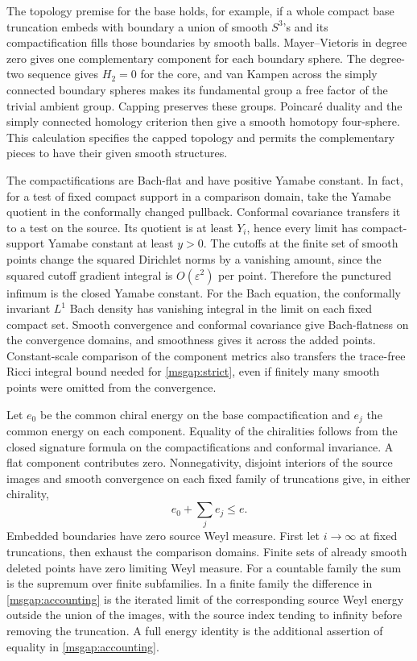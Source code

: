 \documentclass[11pt]{article}
\numberwithin{equation}{section}
\theoremstyle{definition}
\theoremstyle{remark}
\begin{document}
The topology premise for the base holds, for example, if a whole
compact base truncation embeds with boundary a union of smooth
\(S^3\)'s and its compactification fills those boundaries by
smooth balls. Mayer--Vietoris in degree zero gives one
complementary component for each boundary sphere. The degree-two
sequence gives \(H_2=0\) for the core, and van Kampen across the
simply connected boundary spheres makes its fundamental group a
free factor of the trivial ambient group. Capping preserves these
groups. Poincar\'e duality and the simply connected homology
criterion then give a smooth homotopy four-sphere. This calculation
specifies the capped topology and permits the complementary pieces
to have their given smooth structures.

The compactifications are Bach-flat and have positive Yamabe
constant. In fact, for a test of fixed compact support in a
comparison domain, take the Yamabe quotient in the conformally
changed pullback. Conformal covariance transfers it to a test on
the source. Its quotient is at least \(Y_i\), hence every limit
has compact-support Yamabe constant at least \(y>0\).
The cutoffs at the finite set of smooth points change the squared
Dirichlet norms by a vanishing amount, since the squared cutoff
gradient integral is \(O(\varepsilon^2)\) per point. Therefore the
punctured infimum is the closed Yamabe constant. For the Bach
equation, the conformally invariant \(L^1\) Bach density has
vanishing integral in the limit on each fixed compact set.
Smooth convergence and conformal covariance give Bach-flatness
on the convergence domains, and smoothness gives it across the
added points. Constant-scale comparison of the component metrics
also transfers the trace-free Ricci integral bound needed for
\eqref{msgap:strict}, even if finitely many smooth points were
omitted from the convergence.

Let \(e_0\) be the common chiral energy on the base compactification
and \(e_j\) the common energy on each component. Equality of the
chiralities follows from the closed signature formula on the
compactifications and conformal invariance. A flat component
contributes zero. Nonnegativity, disjoint interiors of the source
images and smooth convergence on each fixed family of truncations
give, in either chirality,
\begin{equation}\label{msgap:accounting}
 e_0+\sum_j e_j\le e .
\end{equation}
Embedded boundaries have zero source Weyl measure. First let
\(i\to\infty\) at fixed truncations, then exhaust the comparison
domains. Finite sets of already smooth deleted points have zero
limiting Weyl measure. For a countable family the sum is the
supremum over finite subfamilies. In a finite family the difference
in \eqref{msgap:accounting} is the iterated limit of the corresponding
source Weyl energy outside the union of the images, with the source
index tending to infinity before removing the truncation.
A full energy identity is the additional assertion of equality in
\eqref{msgap:accounting}.
\end{document}
